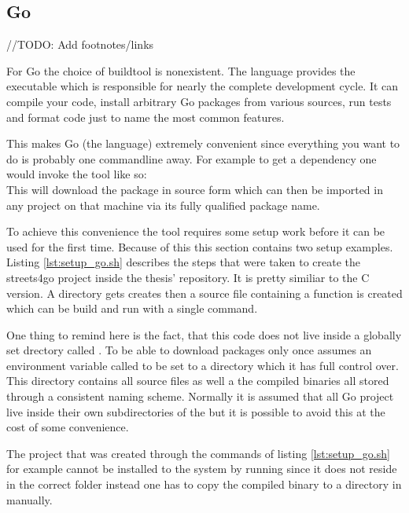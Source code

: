 \subsection{Go}
\label{subsec:Implementation::Setup::Go}

//TODO: Add footnotes/links

For Go the choice of buildtool is nonexistent. The language provides the  executable which is responsible for nearly the complete development cycle. It can compile your code, install arbitrary Go packages from various sources, run tests and format code just to name the most common features.

This makes Go (the language) extremely convenient since everything you want to do is probably one commandline away. For example to get a dependency one would invoke the tool like so:
\\
This will download the package in source form which can then be imported in any project on that machine via its fully qualified package name.

To achieve this convenience the  tool requires some setup work before it can be used for the first time. Because of this this section contains two setup examples.
\\


Listing \ref{lst:setup_go.sh} describes the steps that were taken to create the streets4go project inside the thesis' repository. It is pretty similiar to the C version. A directory gets creates then a source file containing a  function is created which can be build and run with a single command.

One thing to remind here is the fact, that this code does not live inside a globally set drectory called . To be able to download packages only once  assumes an environment variable called  to be set to a directory which it has full control over. This directory contains all source files as well a the compiled binaries all stored through a consistent naming scheme. Normally it is assumed that all Go project live inside their own subdirectories of the  but it is possible to avoid this at the cost of some convenience.

The project that was created through the commands of listing \ref{lst:setup_go.sh} for example cannot be installed to the system by running  since it does not reside in the correct folder instead one has to copy the compiled binary to a directory in  manually.


